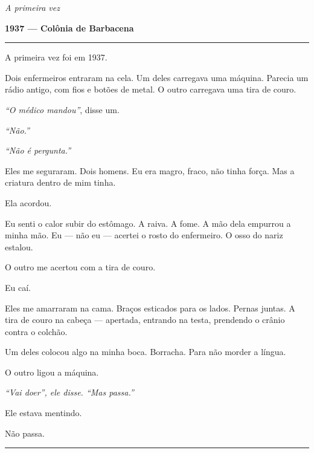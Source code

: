 
\noindent \textit{A primeira vez}

\noindent \textbf{1937 --- Colônia de Barbacena}

\vspace{0.5em}\noindent\rule{\textwidth}{0.5pt}\vspace{0.5em}

\noindent A primeira vez foi em 1937.

\noindent Dois enfermeiros entraram na cela. Um deles carregava uma máquina. Parecia um rádio antigo, com fios e botões de metal. O outro carregava uma tira de couro.

\noindent \textit{\textquotedblleft{}O médico mandou\textquotedblright{}}, disse um.

\noindent \textit{\textquotedblleft{}Não.\textquotedblright{}}

\noindent \textit{\textquotedblleft{}Não é pergunta.\textquotedblright{}}

\noindent Eles me seguraram. Dois homens. Eu era magro, fraco, não tinha força. Mas a criatura dentro de mim tinha.

\noindent Ela acordou.

\noindent Eu senti o calor subir do estômago. A raiva. A fome. A mão dela empurrou a minha mão. Eu --- não eu --- acertei o rosto do enfermeiro. O osso do nariz estalou.

\noindent O outro me acertou com a tira de couro.

\noindent Eu caí.

\noindent Eles me amarraram na cama. Braços esticados para os lados. Pernas juntas. A tira de couro na cabeça --- apertada, entrando na testa, prendendo o crânio contra o colchão.

\noindent Um deles colocou algo na minha boca. Borracha. Para não morder a língua.

\noindent O outro ligou a máquina.

\noindent \textit{\textquotedblleft{}Vai doer\textquotedblright{}\textit{, ele disse. }\textquotedblleft{}Mas passa.\textquotedblright{}}

\noindent Ele estava mentindo.

\noindent Não passa.

\vspace{0.5em}\noindent\rule{\textwidth}{0.5pt}\vspace{0.5em}

